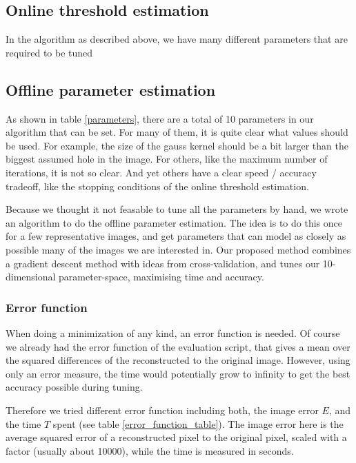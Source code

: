 \documentclass[10pt,conference,compsocconf]{IEEEtran}
\begin{document}
\subsection{Online threshold estimation}
In the algorithm as described above, we have many different parameters that are required to be tuned

\subsection{Offline parameter estimation}
As shown in table \ref{parameters}, there are a total of 10 parameters in our algorithm that can be set.
For many of them, it is quite clear what values should be used. For example, the size of the gauss kernel
should be a bit larger than the biggest assumed hole in the image. For others, like the maximum number of
iterations, it is not so clear. And yet others have a clear speed / accuracy tradeoff, like the stopping
conditions of the online threshold estimation.

Because we thought it not feasable to tune all the parameters by hand, we wrote an algorithm to
do the offline parameter estimation. The idea is to do this once for a few representative images, and get
parameters that can model as closely as possible many of the images we are interested in.
Our proposed method combines a gradient descent method with ideas from cross-validation, and tunes our
10-dimensional parameter-space, maximising time and accuracy.

\subsubsection{Error function}
When doing a minimization of any kind, an error function is needed. Of course we already had the error function
of the evaluation script, that gives a mean over the squared differences of the reconstructed to the original
image. However, using only an error measure, the time would potentially grow to infinity to get the best accuracy possible during tuning.

Therefore we tried different error function including both, the image error $E$, and the time $T$ spent (see table \ref{error_function_table}). The image error here is the average
squared error of a reconstructed pixel to the original pixel, scaled with a factor (usually about 10000), while the time is measured in seconds.
\end{document}
